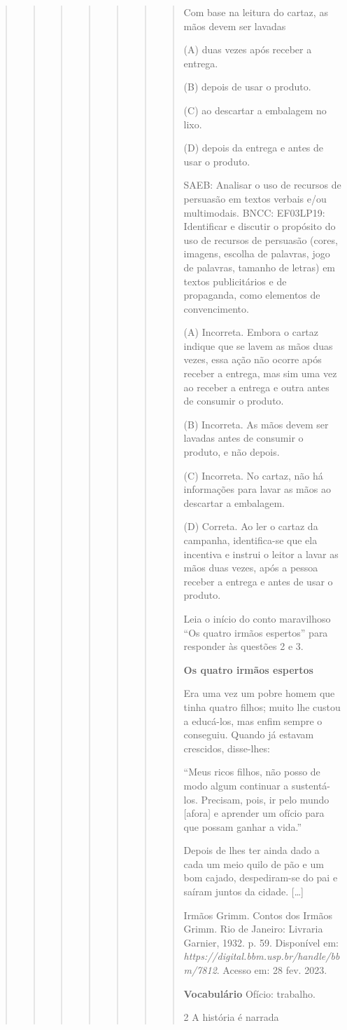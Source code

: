 \begin{boxlist}
{{\begin{quote}
\begin{quote}
\begin{quote}
{\begin{quote}
{\begin{quote}
\begin{quote}
\begin{quote}
Com base na leitura do cartaz, as mãos devem ser lavadas

(A) duas vezes após receber a entrega.

(B) depois de usar o produto.

(C) ao descartar a embalagem no lixo.

(D) depois da entrega e antes de usar o produto.

SAEB: Analisar o uso de recursos de persuasão em textos verbais e/ou multimodais.
BNCC: EF03LP19: Identificar e discutir o propósito do uso de recursos de persuasão (cores,
imagens, escolha de palavras, jogo de palavras, tamanho de letras) em textos publicitários
e de propaganda, como elementos de convencimento.

(A) Incorreta. Embora o cartaz indique que se lavem as mãos duas vezes,
essa ação não ocorre após receber a entrega, mas sim uma vez ao receber
a entrega e outra antes de consumir o produto.

(B) Incorreta. As mãos devem ser lavadas antes de consumir o produto, e
não depois.

(C) Incorreta. No cartaz, não há informações para lavar as mãos ao descartar a embalagem.

(D) Correta. Ao ler o cartaz da campanha, identifica-se que ela
incentiva e instrui o leitor a lavar as mãos duas vezes, após a pessoa
receber a entrega e antes de usar o produto.

Leia o início do conto maravilhoso ``Os quatro irmãos espertos'' para responder às questões 2 e 3.

\textbf{Os quatro irmãos espertos}

Era uma vez um pobre homem que tinha quatro filhos; muito lhe custou a
educá-los, mas enfim sempre o conseguiu. Quando já estavam crescidos,
disse-lhes:

``Meus ricos filhos, não posso de modo algum continuar a sustentá-los.
Precisam, pois, ir pelo mundo [afora] e aprender um ofício para que possam
ganhar a vida.''

Depois de lhes ter ainda dado a cada um meio quilo de pão e um bom
cajado, despediram-se do pai e saíram juntos da cidade. {[}\ldots{}{]}

Irmãos Grimm. Contos dos Irmãos Grimm. Rio de
Janeiro: Livraria Garnier, 1932. p. 59. Disponível em:
\emph{https://digital.bbm.usp.br/handle/bbm/7812}. Acesso em: 28 fev. 2023.

\textbf{Vocabulário}
Ofício: trabalho.

\num{2} A história é narrada


\end{quote}
\end{quote}
\end{quote}}
\end{quote}}
\end{quote}
\end{quote}
\end{quote}}}
\end{boxlist}
